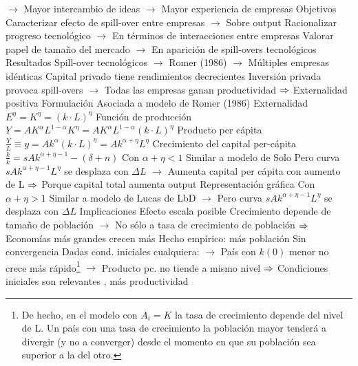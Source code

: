 \documentclass{nuevotema}
\begin{document}
\begin{esquemal}
				\4[] $\to$ Mayor intercambio de ideas
				\4[] $\to$ Mayor experiencia de empresas
				\4 Objetivos
				\4[] Caracterizar efecto de spill-over entre empresas
				\4[] $\to$ Sobre output
				\4[] Racionalizar progreso tecnológico
				\4[] $\to$ En términos de interacciones entre empresas
				\4[] Valorar papel de tamaño del mercado
				\4[] $\to$ En aparición de spill-overs tecnológicos
				\4 Resultados
				\4[] Spill-over tecnológicos
				\4[] $\to$ Romer (1986)
				\4[] $\to$ Múltiples empresas idénticas
				\4[] Capital privado tiene rendimientos decrecientes
				\4[] Inversión privada provoca spill-overs
				\4[] $\to$ Todas las empresas ganan productividad
				\4[] $\Rightarrow$ Externalidad positiva
			\3 Formulación
				\4 Asociada a modelo de Romer (1986)
				\4 Externalidad
				\4[] $E^\eta = K^\eta = \left( k \cdot L \right)^\eta$
				\4 Función de producción
				\4[] $Y=A K^\alpha L^{1-\alpha} K^\eta = A K^\alpha L^{1-\alpha} \left( k \cdot L \right)^\eta $
				\4 Producto per cápita
				\4[] $\frac{Y}{L} \equiv y =  A k^\alpha (k \cdot L)^\eta = A k^{\alpha+\eta}L^\eta $
				\4 Crecimiento del capital per-cápita
				\4[] $\frac{\dot{k}}{k} = s A k^{\alpha+\eta - 1} - (\delta + n)$
				\4 Con $\alpha + \eta < 1$
				\4[] Similar a modelo de Solo
				\4[] Pero curva $sAk^{\alpha+\eta-1} L^\eta$ se desplaza con $\Delta L$
				\4[] $\to$ Aumenta capital per cápita con aumento de L
				\4[] $\Rightarrow$ Porque capital total aumenta output
				\4[] Representación gráfica
				\4[] 
				\4 Con $\alpha + \eta > 1$
				\4[] Similar a modelo de Lucas de LbD
				\4[] $\to$ Pero curva $sAk^{\alpha+\eta-1} L^\eta$ se desplaza con $\Delta L$
			\3 Implicaciones
				\4 Efecto escala posible
				\4[] Crecimiento depende de tamaño de población
				\4[] $\to$ No sólo a tasa de crecimiento de población
				\4[] $\Rightarrow$ Economías más grandes crecen más
				\4[] Hecho empírico: más población
				\4 Sin convergencia
				\4[] Dadas cond. iniciales cualquiera:
				\4[] $\to$ País con $k(0)$ menor no crece más rápido\footnote{De hecho, en el modelo con $A_i = K$ la tasa de crecimiento depende del nivel de L. Un país con una tasa de crecimiento la población mayor tenderá a divergir (y no a converger) desde el momento en que su población sea superior a la del otro.}
				\4[] $\to$ Producto pc. no tiende a mismo nivel
				\4[] $\Rightarrow$ Condiciones iniciales son relevantes
, más productividad

\end{esquemal}
\end{document}

